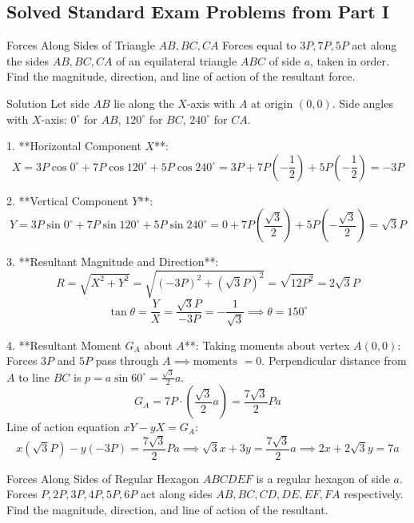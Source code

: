 \documentclass[11pt,a4paper]{article}
\begin{document}
\subsection{Solved Standard Exam Problems from Part I}

\begin{examplebox}{Forces Along Sides of Triangle $AB, BC, CA$}
Forces equal to $3P, 7P, 5P$ act along the sides $AB, BC, CA$ of an equilateral triangle $ABC$ of side $a$, taken in order. Find the magnitude, direction, and line of action of the resultant force.
\end{examplebox}

\begin{proofbox}{Solution}
Let side $AB$ lie along the $X$-axis with $A$ at origin $(0,0)$.
Side angles with $X$-axis: $0^\circ$ for $AB$, $120^\circ$ for $BC$, $240^\circ$ for $CA$.

1. **Horizontal Component $X$**:
\[
X = 3P \cos 0^\circ + 7P \cos 120^\circ + 5P \cos 240^\circ = 3P + 7P\left(-\frac{1}{2}\right) + 5P\left(-\frac{1}{2}\right) = -3P
\]

2. **Vertical Component $Y$**:
\[
Y = 3P \sin 0^\circ + 7P \sin 120^\circ + 5P \sin 240^\circ = 0 + 7P\left(\frac{\sqrt{3}}{2}\right) + 5P\left(-\frac{\sqrt{3}}{2}\right) = \sqrt{3}P
\]

3. **Resultant Magnitude and Direction**:
\[
R = \sqrt{X^2 + Y^2} = \sqrt{(-3P)^2 + (\sqrt{3}P)^2} = \sqrt{12P^2} = 2\sqrt{3}P
\]
\[
\tan\theta = \frac{Y}{X} = \frac{\sqrt{3}P}{-3P} = -\frac{1}{\sqrt{3}} \implies \theta = 150^\circ
\]

4. **Resultant Moment $G_A$ about $A$**:
Taking moments about vertex $A(0,0)$:
Forces $3P$ and $5P$ pass through $A \implies \text{moments } = 0$.
Perpendicular distance from $A$ to line $BC$ is $p = a\sin 60^\circ = \frac{\sqrt{3}}{2}a$.
\[
G_A = 7P \cdot \left(\frac{\sqrt{3}}{2}a\right) = \frac{7\sqrt{3}}{2}Pa
\]
Line of action equation $xY - yX = G_A$:
\[
x(\sqrt{3}P) - y(-3P) = \frac{7\sqrt{3}}{2}Pa \implies \sqrt{3}x + 3y = \frac{7\sqrt{3}}{2}a \implies 2x + 2\sqrt{3}y = 7a
\]
\end{proofbox}

\begin{examplebox}{Forces Along Sides of Regular Hexagon}
$ABCDEF$ is a regular hexagon of side $a$. Forces $P, 2P, 3P, 4P, 5P, 6P$ act along sides $AB, BC, CD, DE, EF, FA$ respectively. Find the magnitude, direction, and line of action of the resultant.
\end{examplebox}
\end{document}
